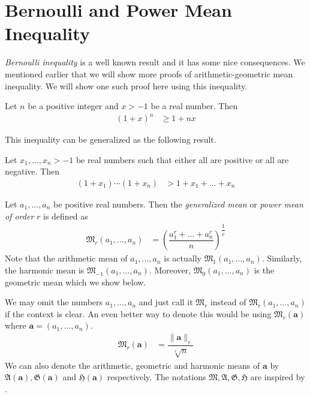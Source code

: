 \documentclass{subfile}
\begin{document}
	\section{Bernoulli and Power Mean Inequality}\label{sec:powermean}
	\emph{Bernoulli inequality} is a well known result and it has some nice consequences. We mentioned earlier that we will show more proofs of arithmetic-geometric mean inequality. We will show one such proof here using this inequality.
		\begin{theorem}
			Let $n$ be a positive integer and $x>-1$ be a real number. Then
				\begin{align*}
					(1+x)^n
						& \geq1+nx
				\end{align*}
		\end{theorem}
	This inequality can be generalized as the following result.
		\begin{theorem}
			Let $x_1,\ldots,x_n>-1$ be real numbers such that either all are positive or all are negative. Then
				\begin{align*}
					(1+x_1)\cdots(1+x_n)
						& > 1+x_1+\ldots+x_n
				\end{align*}
		\end{theorem}%
	
		\begin{definition}
			Let $a_1,\ldots,a_n$ be positive real numbers. Then the \emph{generalized mean} or \emph{power mean of order} $r$ is defined as
				\begin{align*}
					\mathfrak{M}_r(a_1,\ldots,a_n)
						& = \left(\dfrac{a_1^r+\ldots+a_n^r}{n}\right)^{\dfrac{1}{r}}
				\end{align*}
			Note that the arithmetic mean of $a_1,\ldots,a_n$ is actually $\mathfrak{M}_1(a_1,\ldots,a_n)$. Similarly, the harmonic mean is $\mathfrak{M}_{-1}(a_1,\ldots,a_n)$. Moreover, $\mathfrak{M}_0(a_1,\ldots,a_n)$ is the geometric mean which we show below.
		\end{definition}
	We may omit the numbers $a_{1},\ldots,a_{n}$ and just call it $\mathfrak{M}_r$ instead of $\mathfrak{M}_r(a_1,\ldots,a_n)$ if the context is clear. An even better way to denote this would be using $\mathfrak{M}_{r}(\mathbf{a})$ where $\mathbf{a}=(a_{1},\ldots,a_{n})$.
		\begin{align*}
			\mathfrak{M}_{r}(\mathbf{a})
				& = \dfrac{\|\mathbf{a}\|_{r}}{\sqrt[r]{n}}
		\end{align*}
	We can also denote the arithmetic, geometric and harmonic means of $\mathbf{a}$ by $\mathfrak{A}(\mathbf{a}),\mathfrak{G}(\mathbf{a})$ and $\mathfrak{H}(\mathbf{a})$ respectively. The notations $\mathfrak{M},\mathfrak{A},\mathfrak{G},\mathfrak{H}$ are inspired by \textcite{hardy_littlewood_polya_2018}. 
	
\end{document}
